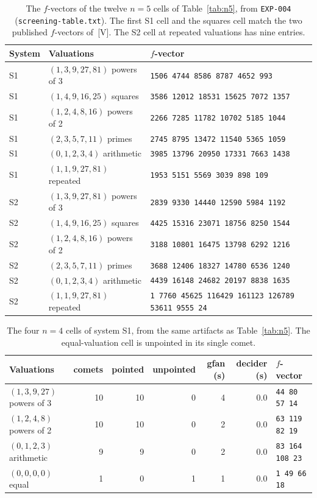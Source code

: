 \documentclass[11pt]{article}
\theoremstyle{definition}
\theoremstyle{remark}
\newcommand{\mk}[1]{\,{\scriptsize[#1]}}
\newcommand{\Vm}{\mk{V}}
\begin{document}
\begin{table}[t]\centering\footnotesize\setlength{\tabcolsep}{3pt}
\begin{tabular}{@{}lll@{}}
\toprule
System & Valuations & $f$-vector \\
\midrule
S1 & $(1,3,9,27,81)$ powers of 3 & \texttt{1506 4744 8586 8787 4652 993} \\
S1 & $(1,4,9,16,25)$ squares & \texttt{3586 12012 18531 15625 7072 1357} \\
S1 & $(1,2,4,8,16)$ powers of 2 & \texttt{2266 7285 11782 10702 5185 1044} \\
S1 & $(2,3,5,7,11)$ primes & \texttt{2745 8795 13472 11540 5365 1059} \\
S1 & $(0,1,2,3,4)$ arithmetic & \texttt{3985 13796 20950 17331 7663 1438} \\
S1 & $(1,1,9,27,81)$ repeated & \texttt{1953 5151 5569 3039 898 109} \\
\midrule
S2 & $(1,3,9,27,81)$ powers of 3 & \texttt{2839 9330 14440 12590 5984 1192} \\
S2 & $(1,4,9,16,25)$ squares & \texttt{4425 15316 23071 18756 8250 1544} \\
S2 & $(1,2,4,8,16)$ powers of 2 & \texttt{3188 10801 16475 13798 6292 1216} \\
S2 & $(2,3,5,7,11)$ primes & \texttt{3688 12406 18327 14780 6536 1240} \\
S2 & $(0,1,2,3,4)$ arithmetic & \texttt{4439 16148 24682 20197 8838 1635} \\
S2 & $(1,1,9,27,81)$ repeated & \texttt{1 7760 45625 116429 161123 126789 53611 9555 24} \\
\bottomrule
\end{tabular}
\caption{The $f$-vectors of the twelve $n=5$ cells of Table~\ref{tab:n5}, from \texttt{EXP-004}
(\texttt{screening-table.txt}). The first S1 cell and the squares cell match the two published
$f$-vectors of \cite{JL25}\Vm. The S2 cell at repeated valuations has nine entries.}\label{tab:f5}
\end{table}

\begin{table}[t]\centering\footnotesize\setlength{\tabcolsep}{3pt}
\begin{tabular}{@{}lrrrrrl@{}}
\toprule
Valuations & comets & pointed & unpointed & gfan (s) & decider (s) & $f$-vector \\
\midrule
$(1,3,9,27)$ powers of 3 & 10 & 10 & 0 & 4 & 0.0 & \texttt{44 80 57 14} \\
$(1,2,4,8)$ powers of 2 & 10 & 10 & 0 & 2 & 0.0 & \texttt{63 119 82 19} \\
$(0,1,2,3)$ arithmetic & 9 & 9 & 0 & 2 & 0.0 & \texttt{83 164 108 23} \\
$(0,0,0,0)$ equal & 1 & 0 & 1 & 1 & 0.0 & \texttt{1 49 66 18} \\
\bottomrule
\end{tabular}
\caption{The four $n=4$ cells of system S1, from the same artifacts as Table~\ref{tab:n5}.
The equal-valuation cell is unpointed in its single comet.}\label{tab:n4}
\end{table}
\end{document}
